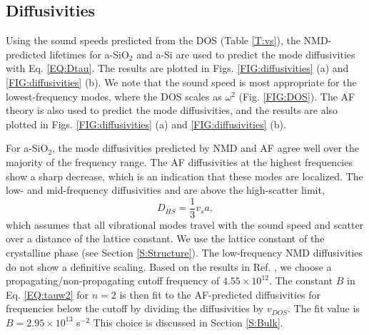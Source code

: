 \documentclass[aps,prb,onecolumn,preprint,superscriptaddress,footinbib,amsmath,amssymb,floatfix]{revtex4}
\begin{document}
\subsection{\label{S:Diffusivities}Diffusivities}

Using the sound speeds predicted 
from the DOS (Table \ref{T:vs}), the NMD-predicted lifetimes 
for a-SiO$_2$ and a-Si are used to predict the mode diffusivities with 
Eq. \eqref{EQ:Dtau}. The results are plotted in 
Figs. \ref{FIG:diffusivities} (a) and \ref{FIG:diffusivities} (b).  
We note that the sound speed is most appropriate  
for the lowest-frequency modes, where the DOS scales as $\omega^2$ 
(Fig. \ref{FIG:DOS}). The AF theory is also used to predict the mode 
diffusivities, and the results are also plotted in 
Figs. \ref{FIG:diffusivities} (a) and \ref{FIG:diffusivities} (b). 

For a-SiO$_2$, the mode diffusivities predicted by NMD and AF agree 
well over the majority of the frequency range. The AF diffusivities at 
the highest frequencies 
show a sharp decrease, which is an indication 
that these modes are localized.\cite{feldman_thermal_1993} 
The low- and mid-frequency diffusivities and are above the 
high-scatter limit, 
\begin{equation}\label{EQ:D_HS}
D_{HS} = \frac{1}{3} v_s a,
\end{equation}
which assumes that all vibrational modes travel with the sound speed  
and scatter over a distance of the lattice constant.
\cite{cahill_lattice_1988} We use the lattice constant of the 
crystalline phase (see Section \ref{S:Structure}). The low-frequency 
NMD diffusivities do not show a 
definitive scaling. Based on the results in 
Ref. , we choose a 
propagating/non-propagating cutoff frequency of $4.55\times10^{12}$. 
The constant $B$ in Eq. \eqref{EQ:tauw2} for $n=2$ 
is then fit to the AF-predicted diffusivities for 
frequencies below the cutoff by dividing the diffusivities 
by $v_{DOS}$. The fit value is $B=2.95\times10^{13}$ s$^{-2}$
This choice is discussed in Section \ref{S:Bulk}.
\end{document}

